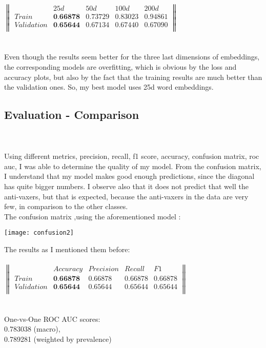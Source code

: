 \documentclass{article}
\begin{document}
$
\begin{Vmatrix}
& 25d & 50d & 100d & 200d\\
Train & \textbf{0.66878} & 0.73729 & 0.83023 & 0.94861\\
Validation & \textbf{0.65644} & 0.67134 & 0.67440 & 0.67090\\
\end{Vmatrix} 
$ \\ \\ \\
Even though the results seem better for the three last dimensions of embeddings, the corresponding models are overfitting, which is obvious by the loss and accuracy plots, but also by the fact that the training results are much better than the validation ones. So, my best model uses 25d word embeddings. 
\subsection{Evaluation - Comparison}
\\ \\
Using different metrics, precision, recall, f1 score, accuracy, confusion matrix, roc auc, I was able to determine the quality of my model. From the confusion matrix, I understand that my model makes good enough predictions, since the diagonal has quite bigger numbers. I observe also that it does not predict that well the anti-vaxers, but that is expected, because the anti-vaxers in the data are very few, in comparison to the other classes. \\The confusion matrix ,using the aforementioned model :
\begin{center}
\texttt{[image: confusion2]}
\end{center}
The results as I mentioned them before: \\ \\
$
\begin{Vmatrix}
& Accuracy & Precision &  Recall & F1\\
Train & \textbf{0.66878} & 0.66878 &0.66878 & 0.66878\\
Validation & \textbf{0.65644} & 0.65644 & 0.65644 & 0.65644\\
\end{Vmatrix} 
$ \\ \\ \\
One-vs-One ROC AUC scores: \\
0.783038 (macro), \\
0.789281 (weighted by prevalence) \\
\end{document}
